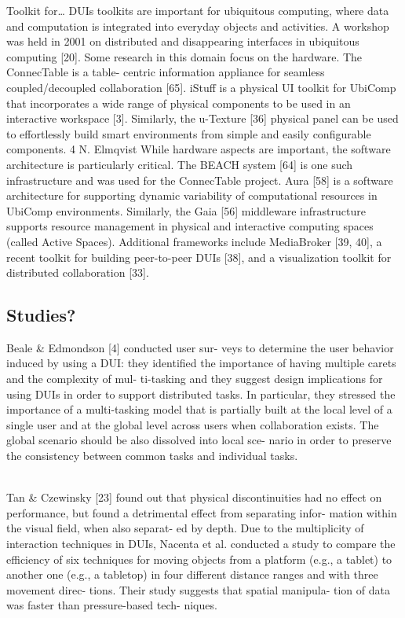 \cite{melchior69toolkit} Toolkit for\ldots
\cite{elmqvist2011distributed}
DUIs toolkits are important for ubiquitous computing, where data and computation is integrated into everyday objects and activities. A workshop was held in 2001 on distributed and disappearing interfaces in ubiquitous computing [20].
Some research in this domain focus on the hardware. The ConnecTable is a table- centric information appliance for seamless coupled/decoupled collaboration [65]. iStuff is a physical UI toolkit for UbiComp that incorporates a wide range of physical components to be used in an interactive workspace [3]. Similarly, the u-Texture [36] physical panel can be used to effortlessly build smart environments from simple and easily configurable components.
4 N. Elmqvist
While hardware aspects are important, the software architecture is particularly critical. The BEACH system [64] is one such infrastructure and was used for the ConnecTable project. Aura [58] is a software architecture for supporting dynamic variability of computational resources in UbiComp environments. Similarly, the Gaia [56] middleware infrastructure supports resource management in physical and interactive computing spaces (called Active Spaces). Additional frameworks include MediaBroker [39, 40], a recent toolkit for building peer-to-peer DUIs [38], and a visualization toolkit for distributed collaboration [33].


\subsection{Studies?}
\cite{vanderdonckt2010distributed} Beale & Edmondson [4] conducted user sur-
veys to determine the user behavior induced by using a DUI: they identified the
importance of having multiple carets and the complexity of mul- ti-tasking and
they suggest design implications for using DUIs in order to support distributed
tasks. In particular, they stressed the importance of a multi-tasking model that is partially built at the local level of a single user and at the global level across users when collaboration exists. The global scenario should be also dissolved into local sce- nario in order to preserve the consistency between common tasks and individual tasks.\\\
 
\cite{vanderdonckt2010distributed} Tan & Czewinsky [23] found out that physical
discontinuities had no effect on performance, but found a detrimental effect from separating infor- mation within the visual field, when also separat- ed by depth. Due to the multiplicity of interaction techniques in DUIs, Nacenta et al. conducted a study to compare the efficiency of six techniques for moving objects from a platform (e.g., a tablet) to another one (e.g., a tabletop) in four different distance ranges and with three movement direc- tions. Their study suggests that spatial manipula- tion of data was faster than pressure-based tech- niques.\\

